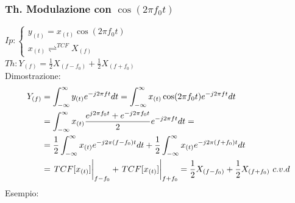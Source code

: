         \subsubsection{Th. Modulazione con $\cos(2\pi f_0t)$}\label{Modulazione con coseno}
            $Ip:\begin{cases}
                    y_{(t)}= x_{(t)}\cos(2\pi f_0t)\\        
                    x_{(t)}\rightleftharpoons^{TCF} X_{(f)}
                \end{cases}$\\
            $Th: Y_{(f)} = \frac{1}{2} X_{(f-f_0)} + \frac{1}{2} X_{(f+f_0)}$ \\
            Dimostrazione:
            \begin{align}
                Y_{(f)} & = \int_{-\infty}^{\infty} y_{(t)} e^{-j2\pi ft} dt = \int_{-\infty}^{\infty} x_{(t)}\cos(2\pi f_0t) e^{-j2\pi ft} dt \nonumber \\
                & =\int_{-\infty}^{\infty} x_{(t)} \frac{e^{j2\pi f_0t} + e^{-j2\pi f_0t}}{2} e^{-j2\pi ft} dt =  \nonumber \\
                & = \frac{1}{2} \int_{-\infty}^{\infty} x_{(t)} e^{-j2\pi (f-f_0)t} dt + \frac{1}{2} \int_{-\infty}^{\infty} x_{(t)} e^{-j2\pi (f+f_0)t} dt \nonumber \\
                & = \eval{TCF[x_{(t)}]}_{f-f_0} + \eval{TCF[x_{(t)}]}_{f+f_0} = \frac{1}{2} X_{(f-f_0)} + \frac{1}{2} X_{(f+f_0)}\ c.v.d \nonumber  
            \end{align}
            Esempio:\\
